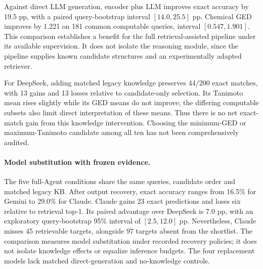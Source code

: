 Against direct LLM generation, encoder plus LLM improves exact accuracy by 19.5 pp, with a paired query-bootstrap interval $[14.0,25.5]$ pp. Chemical GED improves by 1.221 on 181 common computable queries, interval $[0.547,1.901]$. This comparison establishes a benefit for the full retrieval-assisted pipeline under its available supervision. It does not isolate the reasoning module, since the pipeline supplies known candidate structures and an experimentally adapted retriever.

For DeepSeek, adding matched legacy knowledge preserves 44/200 exact matches, with 13 gains and 13 losses relative to candidate-only selection. Its Tanimoto mean rises slightly while its GED means do not improve; the differing computable subsets also limit direct interpretation of these means. Thus there is no net exact-match gain from this knowledge intervention. Choosing the minimum-GED or maximum-Tanimoto candidate among all ten has not been comprehensively audited.

\paragraph{Model substitution with frozen evidence.}\label{sec:agent_models}
The five full-Agent conditions share the same queries, candidate order and matched legacy KB. After output recovery, exact accuracy ranges from 16.5\% for Gemini to 29.0\% for Claude. Claude gains 23 exact predictions and loses six relative to retrieval top-1. Its paired advantage over DeepSeek is 7.0 pp, with an exploratory query-bootstrap 95\% interval of $[2.5,12.0]$ pp. Nevertheless, Claude misses 45 retrievable targets, alongside 97 targets absent from the shortlist. The comparison measures model substitution under recorded recovery policies; it does not isolate knowledge effects or equalize inference budgets. The four replacement models lack matched direct-generation and no-knowledge controls.

